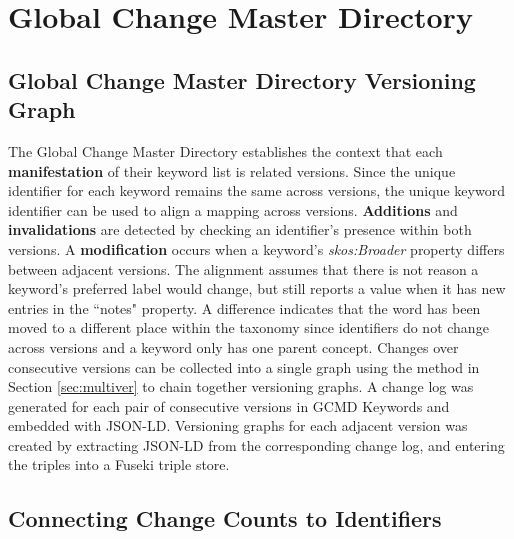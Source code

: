\section{Global Change Master Directory}

\subsection{Global Change Master Directory Versioning Graph}

The Global Change Master Directory establishes the context that each \textbf{manifestation} of their keyword list is related versions.
Since the unique identifier for each keyword remains the same across versions, the unique keyword identifier can be used to align a mapping across versions.
\textbf{Additions} and \textbf{invalidations} are detected by checking an identifier's presence within both versions.
A \textbf{modification} occurs when a keyword's \textit{skos:Broader} property differs between adjacent versions.
The alignment assumes that there is not reason a keyword's preferred label would change, but still reports a value when it has new entries in the ``notes" property.
A difference indicates that the word has been moved to a different place within the taxonomy since identifiers do not change across versions and a keyword only has one parent concept.
Changes over consecutive versions can be collected into a single graph using the method in Section \ref{sec:multiver} to chain together versioning graphs.
A change log was generated for each pair of consecutive versions in GCMD Keywords and embedded with JSON-LD.
Versioning graphs for each adjacent version was created by extracting JSON-LD from the corresponding change log, and entering the triples into a Fuseki triple store.

\subsection{Connecting Change Counts to Identifiers} \label{gcmd_85}

